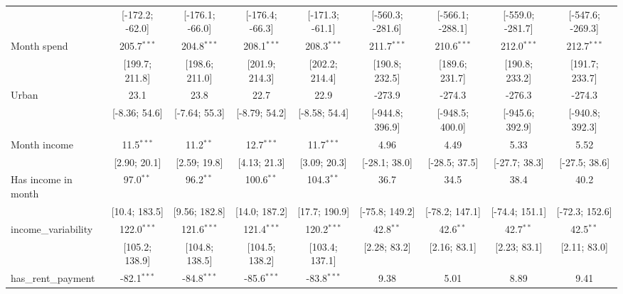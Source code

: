 \begin{table}[htbp]
\begin{threeparttable}[b]
\begin{tabular}{lcccccccc}
                                  & [-172.2; -62.0]  & [-176.1; -66.0]  & [-176.4; -66.3]  & [-171.3; -61.1]  & [-560.3; -281.6] & [-566.1; -288.1] & [-559.0; -281.7] & [-547.6; -269.3]\\   
         Month spend              & 205.7$^{***}$    & 204.8$^{***}$    & 208.1$^{***}$    & 208.3$^{***}$    & 211.7$^{***}$    & 210.6$^{***}$    & 212.0$^{***}$    & 212.7$^{***}$\\   
                                  & [199.7; 211.8]   & [198.6; 211.0]   & [201.9; 214.3]   & [202.2; 214.4]   & [190.8; 232.5]   & [189.6; 231.7]   & [190.8; 233.2]   & [191.7; 233.7]\\   
         Urban                    & 23.1             & 23.8             & 22.7             & 22.9             & -273.9           & -274.3           & -276.3           & -274.3\\   
                                  & [-8.36; 54.6]    & [-7.64; 55.3]    & [-8.79; 54.2]    & [-8.58; 54.4]    & [-944.8; 396.9]  & [-948.5; 400.0]  & [-945.6; 392.9]  & [-940.8; 392.3]\\   
         Month income             & 11.5$^{***}$     & 11.2$^{**}$      & 12.7$^{***}$     & 11.7$^{***}$     & 4.96             & 4.49             & 5.33             & 5.52\\   
                                  & [2.90; 20.1]     & [2.59; 19.8]     & [4.13; 21.3]     & [3.09; 20.3]     & [-28.1; 38.0]    & [-28.5; 37.5]    & [-27.7; 38.3]    & [-27.5; 38.6]\\   
         Has income in month      & 97.0$^{**}$      & 96.2$^{**}$      & 100.6$^{**}$     & 104.3$^{**}$     & 36.7             & 34.5             & 38.4             & 40.2\\   
                                  & [10.4; 183.5]    & [9.56; 182.8]    & [14.0; 187.2]    & [17.7; 190.9]    & [-75.8; 149.2]   & [-78.2; 147.1]   & [-74.4; 151.1]   & [-72.3; 152.6]\\   
         income\_variability      & 122.0$^{***}$    & 121.6$^{***}$    & 121.4$^{***}$    & 120.2$^{***}$    & 42.8$^{**}$      & 42.6$^{**}$      & 42.7$^{**}$      & 42.5$^{**}$\\   
                                  & [105.2; 138.9]   & [104.8; 138.5]   & [104.5; 138.2]   & [103.4; 137.1]   & [2.28; 83.2]     & [2.16; 83.1]     & [2.23; 83.1]     & [2.11; 83.0]\\   
         has\_rent\_payment       & -82.1$^{***}$    & -84.8$^{***}$    & -85.6$^{***}$    & -83.8$^{***}$    & 9.38             & 5.01             & 8.89             & 9.41\\   

\end{tabular}
\end{threeparttable}
\end{table}
